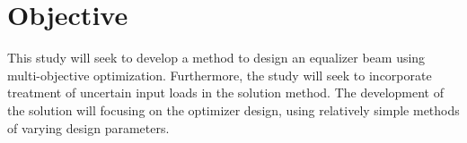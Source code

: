 \section{Objective}
This study will seek to develop a method to design an equalizer beam using multi-objective optimization. Furthermore, the study will seek to incorporate treatment of uncertain input loads in the solution method. The development of the solution will focusing on the optimizer design, using relatively simple methods of varying design parameters. 
